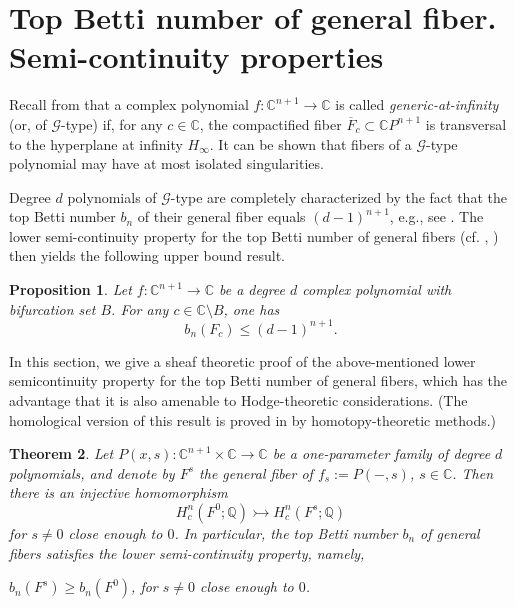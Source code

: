 \documentclass[12pt,leqno,twoside]{amsart}
\newtheorem{theorem}{Theorem}[section]
\newtheorem{proposition}[theorem]{Proposition}
\theoremstyle{remark}
\theoremstyle{remark}
\theoremstyle{definition}
\theoremstyle{remark}
\theoremstyle{remark}
\theoremstyle{remark}
\numberwithin{equation}{section}  %
\def\be{\begin{equation}}
\def\ee{\end{equation}}
\newcommand{\C}{\mathbb{C}}
\newcommand{\Q}{\mathbb{Q}}
\newcommand{\cG}{\mathcal{G}}
\newcommand{\oF}{\overline{F}}
\begin{document}


\section{Top Betti number of general fiber. Semi-continuity properties}\label{top}
Recall from \cite{T2} that a complex polynomial $f\colon\C^{n+1} \to \C$ is called {\it generic-at-infinity} (or, of $\mathcal{G}$-type) if, for any $c\in \C$, the compactified fiber $\oF_c \subset \C P^{n+1}$ is transversal to the hyperplane at infinity $H_\infty$. It can be shown that fibers of a $\cG$-type polynomial may have at most isolated singularities. %

Degree $d$ polynomials of $\cG$-type are completely characterized by the fact that the top Betti number $b_n$ of their general fiber equals $(d-1)^{n+1}$, e.g., see  \cite[Prop.4.1.5]{T2}. The lower semi-continuity property for the top Betti number of general fibers (cf. \cite[Prop.2.1]{ST1}, \cite[Prop.4.2.1]{T2}) then yields the following upper bound result.

\begin{proposition}\label{pr61}
Let $f:\C^{n+1} \to \C$ be a degree $d$ complex polynomial with bifurcation set $B$. For any $c \in \C \setminus B$, one has
\be\label{tb}
b_n(F_c)\leq (d-1)^{n+1}.
\ee
\end{proposition}

In this section, we give a sheaf theoretic proof of the above-mentioned lower semicontinuity property for the top Betti number of general fibers, which has the advantage that it is also amenable to Hodge-theoretic considerations. (The homological version of this result is proved in \cite{ST1,T2} by homotopy-theoretic methods.)

\begin{theorem}\label{lsc}
Let $P(x,s):\C^{n+1} \times \C \to \C$ be a one-parameter family of degree $d$ polynomials, %
and denote by $F^s$ the general fiber of $f_s:=P(-,s)$, $s \in \C$. Then there is an injective homomorphism 
\be\label{injl} H^n_c(F^0;\Q)  \rightarrowtail H^n_c(F^s;\Q) \ee
for $s\neq 0$ close enough to $0$. In particular, the top Betti number $b_n$ of general fibers satisfies the lower semi-continuity property, namely,
\begin{center} $b_n(F^s) \geq b_n(F^0)$, for $s \neq 0$ close enough to $0$.\end{center} 
\end{theorem}
\end{document}
